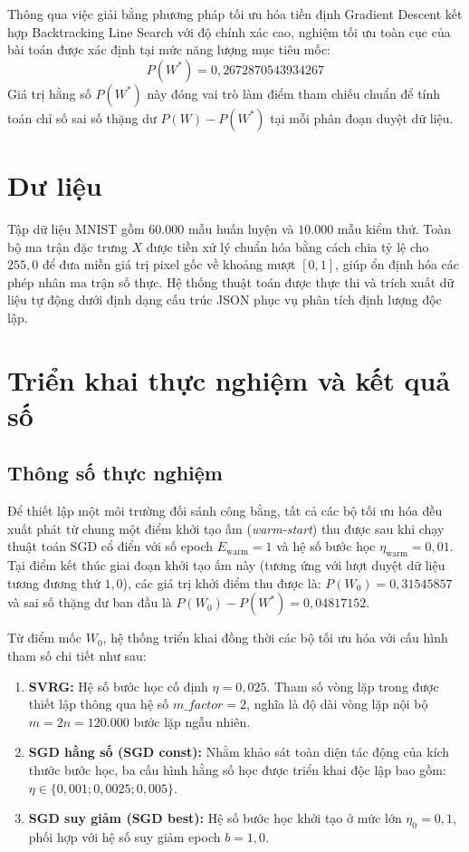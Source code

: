 Thông qua việc giải bằng phương pháp tối ưu hóa tiền định Gradient Descent kết hợp Backtracking Line Search với độ chính xác cao, nghiệm tối ưu toàn cục của bài toán được xác định tại mức năng lượng mục tiêu mốc:
\begin{equation}
P(W^*) = 0,2672870543934267
\end{equation}
Giá trị hằng số $P(W^*)$ này đóng vai trò làm điểm tham chiếu chuẩn để tính toán chỉ số sai số thặng dư $P(W) - P(W^*)$ tại mỗi phân đoạn duyệt dữ liệu.

\section{Dư liệu}

Tập dữ liệu MNIST gồm $60.000$ mẫu huấn luyện và $10.000$ mẫu kiểm thử. Toàn bộ ma trận đặc trưng $X$ được tiền xử lý chuẩn hóa bằng cách chia tỷ lệ cho $255,0$ để đưa miền giá trị pixel gốc về khoảng mượt $[0, 1]$, giúp ổn định hóa các phép nhân ma trận số thực. Hệ thống thuật toán được thực thi và trích xuất dữ liệu tự động dưới định dạng cấu trúc JSON phục vụ phân tích định lượng độc lập.

\section{Triển khai thực nghiệm và kết quả số}

\subsection{Thông số thực nghiệm}

Để thiết lập một môi trường đối sánh công bằng, tất cả các bộ tối ưu hóa đều xuất phát từ chung một điểm khởi tạo ấm (\textit{warm-start}) thu được sau khi chạy thuật toán SGD cổ điển với số epoch $E_{\text{warm}} = 1$ và hệ số bước học $\eta_{\text{warm}} = 0,01$. Tại điểm kết thúc giai đoạn khởi tạo ấm này (tương ứng với lượt duyệt dữ liệu tương đương thứ $1,0$), các giá trị khởi điểm thu được là: $P(W_0) = 0,31545857$ và sai số thặng dư ban đầu là $P(W_0) - P(W^*) = 0,04817152$.

Từ điểm mốc $W_0$, hệ thống triển khai đồng thời các bộ tối ưu hóa với cấu hình tham số chi tiết như sau:
\begin{enumerate}
    \item \textbf{SVRG:} Hệ số bước học cố định $\eta = 0,025$. Tham số vòng lặp trong được thiết lập thông qua hệ số $m\_factor = 2$, nghĩa là độ dài vòng lặp nội bộ $m = 2n = 120.000$ bước lặp ngẫu nhiên. 
    \item \textbf{SGD hằng số (SGD const):} Nhằm khảo sát toàn diện tác động của kích thước bước học, ba cấu hình hằng số học được triển khai độc lập bao gồm: $\eta \in \{0,001; 0,0025; 0,005\}$.
    \item \textbf{SGD suy giảm (SGD best):} Hệ số bước học khởi tạo ở mức lớn $\eta_0 = 0,1$, phối hợp với hệ số suy giảm epoch $b = 1,0$.
\end{enumerate}

